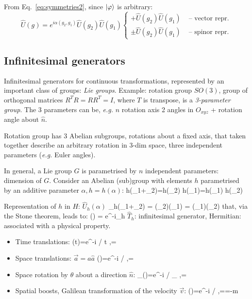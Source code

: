 \documentclass[12pt]{article}
\begin{document}
From Eq.~\eqref{eq:symmetries2}, since $\ket{\varphi}$ is arbitrary:
\[
\hat{U}(g)=e^{i \alpha(g_{2}, g_{1})} \hat{U}(g_{2}) \hat{U}(g_{1})
\left\{
\begin{aligned}
+\hat{U}(g_{2}) \hat{U}(g_{1}) 
&\text{ -- vector repr.}\\
\pm\hat{U}(g_{2}) \hat{U}(g_{1}) 
&\text{ -- spinor repr.}
\end{aligned}
\right.
\]

\subsection{Infinitesimal generators}

Infinitesimal generators 
for continuous transformations, represented
by an important class of groups: \emph{Lie groups}.
Example: rotation group \(S O(3)\), group of orthogonal
matrices \(R^{T} R=RR^{T} =I\), where  \(T\) is transpose,
is a \emph{3-parameter group}.
The 3 parameters can be, \textit{e.g.}
\(n\) rotation axis
2 angles in \(O_{xyz}\) + 
rotation angle about \(\hat{n}\).

Rotation group has 3 Abelian subgroups,
rotations about a fixed axis, that taken together
describe an arbitrary rotation in 3-dim space,
three independent parameters (\emph{e.g.} Euler angles).

In general, a Lie group \(G\) is parametrised by
\(n\) independent parameters: dimension of \(G\).
Consider an Abelian (sub)group with elements \(h\)
parametrised by an additive parameter \(\alpha, h=h(\alpha)\):
\be
h\left(\alpha_{1}+\alpha_{2}\right)=h\left(\alpha_{2}\right) h\left(\alpha_{1}\right)=h\left(\alpha_{1}\right) h\left(\alpha_{2}\right)
\ee


Representation of $h$ in $H$: $\hat{U}_h(\alpha)$
\be
{}_h(\alpha_1+\alpha_2) = (\alpha_2)(\alpha_1) = (\alpha_1)(\alpha_2)
\ee
that, via the Stone theorem, leads to:
\be
{}(\alpha) = e^{-i\alpha {}_h}
\ee
$\hat{T}_h$: infinitesimal generator, Hermitian: associated with a physical property.

\begin{itemize}
\item Time translations:
\be
{}(t)=e^{-i / \hbar {} t} \quad,\quad {}=
\ee
%
\item Space translations: $\vec{a}=a \hat{a}$
\be
{}()=e^{-i / \hbar {} \cdot {}} \quad,\quad {}= \rightarrow {}
\ee
%
\item Space rotation by $\theta$ about a direction $\hat{n}$:
\be
{}_{}(\theta)=e^{-i / \hbar \theta {}_{}} \quad,\quad {}= \cdot {} \rightarrow {}
\ee
%
\item Spatial boosts, Galilean transformation of the velocity $\vec{v}$:
\be
{}()=e^{-i / \hbar {} \cdot {}} \quad,\quad {}==-m  \rightarrow {}
\ee
\end{itemize}
\end{document}
